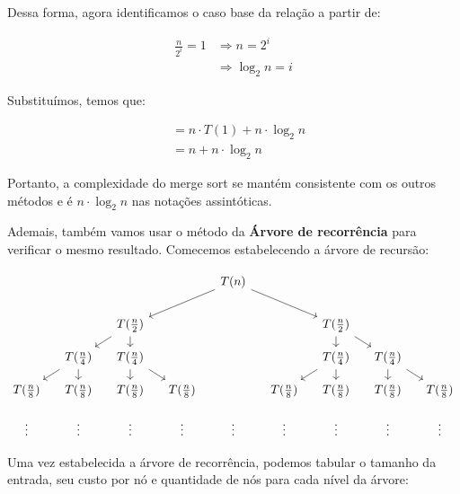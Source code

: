 Dessa forma, agora identificamos o caso base da relação a partir de:

\begin{align*}
	\frac{n}{2^i} = 1 & \Longrightarrow n = 2^i      \\
	                  & \Longrightarrow \log_2 n = i
\end{align*}

Substituímos, temos que:

\begin{align*}
	 & = n \cdot T(1) + n \cdot \log_2 n \\
	 & = n + n \cdot \log_2 n
\end{align*}

Portanto, a complexidade do merge sort se mantém consistente com os outros métodos e é $n \cdot \log_2 n$ nas notações assintóticas.

Ademais, também vamos usar o método da \textbf{Árvore de recorrência} para verificar o mesmo resultado. Comecemos estabelecendo a árvore de recursão:


\[\begin{tikzcd}[sep=small]
		&&&& {T(n)} \\
		\\
		&& {T(\frac{n}{2})} &&&& {T(\frac{n}{2})} \\
		& {T(\frac{n}{4})} & {T(\frac{n}{4})} &&&& {T(\frac{n}{4})} & {T(\frac{n}{4})} \\
		{T(\frac{n}{8})} & {T(\frac{n}{8})} & {T(\frac{n}{8})} & {T(\frac{n}{8})} && {T(\frac{n}{8})} & {T(\frac{n}{8})} & {T(\frac{n}{8})} & {T(\frac{n}{8})} \\
		\vdots & \vdots & \vdots & \vdots & \vdots & \vdots & \vdots & \vdots & \vdots
		\arrow[from=1-5, to=3-3]
		\arrow[from=1-5, to=3-7]
		\arrow[from=3-3, to=4-2]
		\arrow[from=3-3, to=4-3]
		\arrow[from=3-7, to=4-7]
		\arrow[from=3-7, to=4-8]
		\arrow[from=4-2, to=5-1]
		\arrow[from=4-2, to=5-2]
		\arrow[from=4-3, to=5-3]
		\arrow[from=4-3, to=5-4]
		\arrow[from=4-7, to=5-6]
		\arrow[from=4-7, to=5-7]
		\arrow[from=4-8, to=5-8]
		\arrow[from=4-8, to=5-9]
	\end{tikzcd}\]
\FloatBarrier

Uma vez estabelecida a árvore de recorrência, podemos tabular o tamanho da entrada, seu custo por nó e quantidade de nós para cada nível da árvore:


